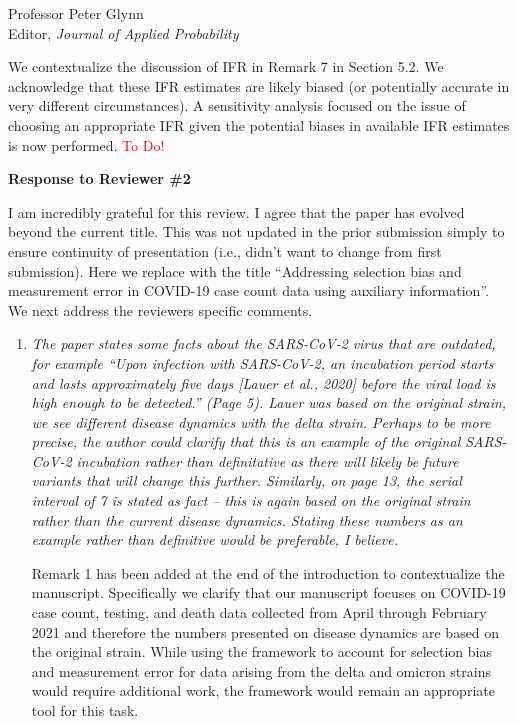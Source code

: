 \documentclass[11pt]{letter} %
\begin{document}
\begin{letter}{Professor
	Peter Glynn\\
	Editor, {\em Journal of Applied Probability}}
\begin{enumerate}
\begin{enumerate}
    We contextualize the discussion of IFR in Remark 7 in Section 5.2. We acknowledge that these IFR estimates are likely biased (or potentially accurate in very different circumstances).  A sensitivity analysis focused on the issue of choosing an appropriate IFR given the potential biases in available IFR estimates is now performed.
    \textcolor{red}{To Do!}
	\vspace{5mm}
\end{enumerate}
\end{enumerate}
\newpage

{\bf Response to Reviewer \#2}

I am incredibly grateful for this review.  I agree that the paper has evolved beyond the current title.  This was not updated in the prior submission simply to ensure continuity of presentation (i.e., didn't want to change from first submission).  Here we replace with the title ``Addressing selection bias and measurement error in COVID-19 case count data using auxiliary information''.  We next address the reviewers specific comments.

\begin{enumerate}
\item {\it The paper states some facts about the SARS-CoV-2 virus that are outdated, for example “Upon infection with SARS-CoV-2, an incubation period starts and lasts approximately five days [Lauer et al., 2020] before the viral load is high enough to be detected.” (Page 5). Lauer was based on the original
strain, we see different disease dynamics with the delta strain. Perhaps to be more precise, the author could clarify that this is an example of the original SARS-CoV-2 incubation rather than definitative as there will likely be future variants that will change this further. Similarly, on page 13, the serial
interval of 7 is stated as fact – this is again based on the original strain rather than the current disease dynamics. Stating these numbers as an example rather than definitive would be preferable, I believe.}
\vspace{5mm}

Remark 1 has been added at the end of the introduction to contextualize the manuscript.  Specifically we clarify that our manuscript focuses on COVID-19 case count, testing, and death data collected from April through February 2021 and therefore the numbers presented on disease dynamics are based on the original strain.  While using the framework to account for selection bias and measurement error for data arising from the delta and omicron strains would require additional work, the framework would remain an appropriate tool for this task.



\end{enumerate}
\end{letter}
\end{document}
